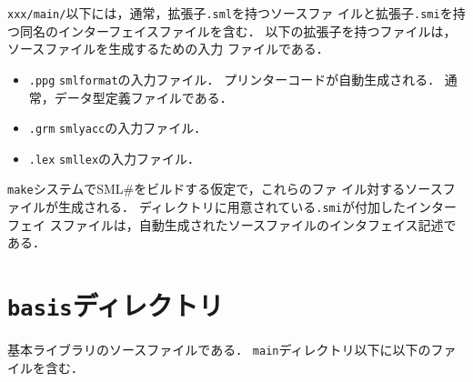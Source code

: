 \documentclass{jbook}
\newif\ifjp
\newcommand{\txt}[2]{#1}
\newcommand{\smlsharp}{SML\#}
\newcommand{\code}[1]{\mbox{\large\tt #1}}
\begin{document}
	\code{xxx/main/}以下には，通常，拡張子\code{.sml}を持つソースファ
イルと拡張子\code{.smi}を持つ同名のインターフェイスファイルを含む．
	以下の拡張子を持つファイルは，ソースファイルを生成するための入力
ファイルである．
\begin{itemize}
\item \code{.ppg} \code{smlformat}の入力ファイル．
	プリンターコードが自動生成される．
	通常，データ型定義ファイルである．
\item \code{.grm} \code{smlyacc}の入力ファイル．
\item \code{.lex} \code{smllex}の入力ファイル．
\end{itemize}
	\code{make}システムで\smlsharp{}をビルドする仮定で，これらのファ
イル対するソースファイルが生成される．
	ディレクトリに用意されている\code{.smi}が付加したインターフェイ
スファイルは，自動生成されたソースファイルのインタフェイス記述である．
\fi%

\section{\txt{\code{basis}ディレクトリ}{The \code{basis} Directory}}
\ifjp%
	基本ライブラリのソースファイルである．
	\code{main}ディレクトリ以下に以下のファイルを含む．
\end{document}
